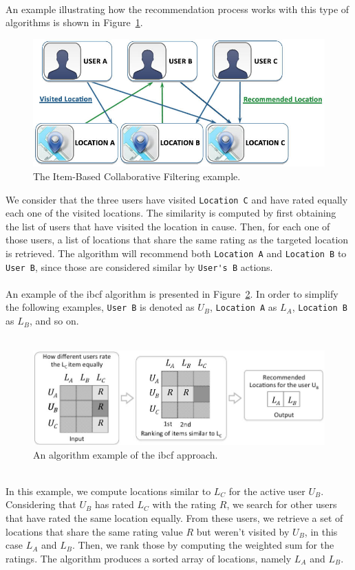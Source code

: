 \\
An example illustrating how the recommendation process works with this type of algorithms is shown in Figure~\ref{fig:ibcfExample1}.
\begin{figure}[h!]
 \centering
   \includegraphics[width=11 cm]{./images/examples/example_item_based_filtering2.jpg}
   \caption{The Item-Based Collaborative Filtering example.}
   \label{fig:ibcfExample1}
\end{figure}
We consider that the three users have visited \verb"Location C" and have rated equally each one of the visited locations. The similarity is computed by first obtaining the list of users that have visited the location in cause. Then, for each one of those users, a list of locations that share the same rating as the targeted location is retrieved. The algorithm will recommend both \verb"Location A" and \verb"Location B" to \verb"User B", since those are considered similar by \verb"User's B" actions.\\
\\
An example of the \gls{ibcf} algorithm is presented in Figure~\ref{fig:exampleAlgIBCF}. In order to simplify the following examples, \verb"User B" is denoted as $U_{B}$, \verb"Location A" as $L_{A}$, \verb"Location B" as $L_{B}$, and so on.\\
\\
\begin{figure}[h!]
 \centering
   \includegraphics[width=11 cm]{./images/flows/flow_example_diagram_ibf.jpg}
   \caption{An algorithm example of the \gls{ibcf} approach.}
   \label{fig:exampleAlgIBCF}
\end{figure}
\\
In this example, we compute locations similar to $L_{C}$ for the active user $U_{B}$. Considering that $U_{B}$ has rated $L_{C}$ with the rating $R$, we search for other users that have rated the same location equally. From these users, we retrieve a set of locations that share the same rating value $R$ but weren't visited by $U_{B}$, in this case $L_{A}$ and $L_{B}$. Then, we rank those by computing the weighted sum for the ratings. The algorithm produces a sorted array of locations, namely $L_{A}$ and $L_{B}$.

